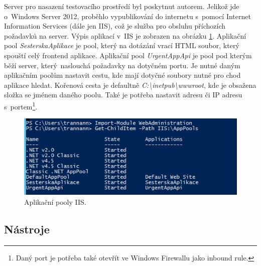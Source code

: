 
Server pro nasazení testovacího prostředí byl poskytnut autorem. Jelikož jde o~Windows Server 2012, proběhlo vypublikování do internetu s~pomocí Internet Information Services (dále jen IIS), což je služba pro obsluhu příchozích požadavků na server. Výpis aplikací v~IIS je zobrazen na obrázku \ref{fig:applicationPools}. Aplikační pool \textit{SesterskaAplikace} je pool, který na dotázání vrací HTML soubor, který spouští celý frontend aplikace. Aplikační pool \textit{UrgentAppApi} je pool pod kterým běží server, který~naslouchá požadavky na dotyčném portu. Je nutné daným aplikačním poolům nastavit cestu, kde mají dotyčné soubory nutné pro chod aplikace hledat. Kořenová cesta je defaultně \textit{C:\textbackslash inetpub\textbackslash wwwroot}, kde je obsažena složka se jménem daného poolu. Také je potřeba nastavit adresu či IP adresu s~portem\footnote{Daný port je potřeba také otevřít ve Windows Firewallu jako inbound rule.}.  


\begin{figure} [H]
	\includegraphics[width=15cm]{../applicationPools.png}
	\caption{Aplikační pooly IIS.}
	\label{fig:applicationPools}
\end{figure}

\subsection{Nástroje}
\label{sec:nastroje}

